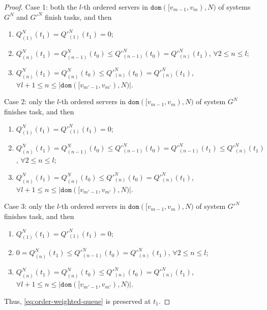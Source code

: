 \documentclass[11pt, reqno]{article}
\numberwithin{equation}{section}
\numberwithin{theorem}{section}
\newcommand{\dom}{\texttt{dom}}
\begin{document}
\begin{proof}
\noindent
Case 1: both the $l$-th ordered servers in $\dom([v_{m-1},v_m),N)$ of systems $G^N$ and $G'^N$ finish tasks, and then \begin{enumerate}[\normalfont(i)]
     \item $Q^N_{(1)}(t_1)=Q'^N_{(1)}(t_1)=0$;
     \item $Q^N_{(n)}(t_1)=Q^N_{(n-1)}(t_0)\leq Q'^N_{(n-1)}(t_0)=Q'^N_{(n)}(t_1)$, $\forall 2\leq n\leq l$;
     \item $Q^N_{(n)}(t_1)=Q^N_{(n)}(t_0)\leq Q'^N_{(n)}(t_0)=Q'^N_{(n)}(t_1)$, $\forall l+1\leq n\leq |\dom([v_{m'-1},v_{m'}),N)|$.
 \end{enumerate} 
 Case 2: only the $l$-th ordered servers in  $\dom([v_{m-1},v_m),N)$ of system $G^N$ finishes task, and then
 \begin{enumerate}[\normalfont(i)]
     \item $Q^N_{(1)}(t_1)=Q'^N_{(1)}(t_1)=0$;
     \item $Q^N_{(n)}(t_1)=Q^N_{(n-1)}(t_0)\leq Q'^N_{(n-1)}(t_0)=Q'^N_{(n-1)}(t_1)\leq Q'^N_{(n)}(t_1)$, $\forall 2\leq n\leq l$;
     \item $Q^N_{(n)}(t_1)=Q^N_{(n)}(t_0)\leq Q'^N_{(n)}(t_0)=Q'^N_{(n)}(t_1)$, $\forall l+1\leq n\leq |\dom([v_{m'-1},v_{m'}),N)|$.
 \end{enumerate}
 Case 3: only the $l$-th ordered servers in  $\dom([v_{m-1},v_m),N)$ of system $G'^N$ finishes task, and then
 \begin{enumerate}[\normalfont(i)]
     \item $Q^N_{(1)}(t_1)=Q'^N_{(1)}(t_1)=0$;
     \item $0=Q^N_{(n)}(t_1)\leq Q'^N_{(n-1)}(t_0)=Q'^N_{(n)}(t_1)$, $\forall 2\leq n\leq l$;
     \item $Q^N_{(n)}(t_1)=Q^N_{(n)}(t_0)\leq Q'^N_{(n)}(t_0)=Q'^N_{(n)}(t_1)$, $\forall l+1\leq n\leq |\dom([v_{m'-1},v_{m'}),N)|$.
 \end{enumerate}
Thus, \eqref{eq:order-weighted-queue} is preserved at $t_1$.
\end{proof}
\end{document}
